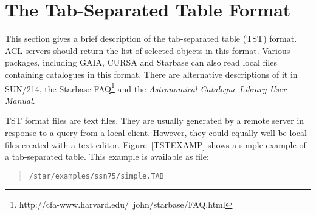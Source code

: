 \documentclass[twoside,11pt]{article}
\newcommand{\htmladdnormallinkfoot}[2]{#1\footnote{#2}}
\newcommand{\xref}[3]{#1}
\newcommand{\xlabel}[1]{}
\renewcommand{\_}{\texttt{\symbol{95}}}
\begin{document}
\section{\xlabel{TST_R}\label{TST_R}The Tab-Separated Table Format}

This section gives a brief description of the tab-separated table (TST)
format.  ACL servers should return the list of selected objects in this
format.  Various packages, including GAIA, CURSA and Starbase can also
read local files containing catalogues in this format.  There are
alternative descriptions of it in \xref{SUN/214}{sun214}{}\cite{SUN214},
the \htmladdnormallinkfoot{Starbase FAQ}
{http://cfa-www.harvard.edu/~john/starbase/FAQ.html}
and the {\it Astronomical Catalogue Library User Manual}\/\cite{BRIGHTON98}.

TST format files are text files.  They are usually generated by a remote
server in response to a query from a local client.  However, they could
equally well be local files created with a text editor.
Figure~\ref{TSTEXAMP} shows a simple example of a tab-separated table.
This example is available as file:

\begin{verse}
{\tt /star/examples/ssn75/simple.TAB}
\end{verse}
\end{document}
